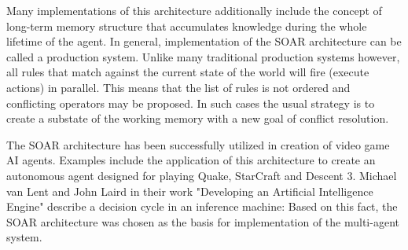 Many implementations of this architecture additionally include the concept of long-term memory structure that accumulates knowledge during the whole lifetime of the agent.
In general, implementation of the SOAR architecture can be called a production system.
Unlike many traditional production systems however, all rules that match against the current state of the world will fire (execute actions) in parallel.
This means that the list of rules is not ordered and conflicting operators may be proposed.
In such cases the usual strategy is to create a substate of the working memory with a new goal of conflict resolution.

The SOAR architecture has been successfully utilized in creation of video game AI agents.
Examples include the application of this architecture to create an autonomous agent designed for playing Quake\cite{laird2001knows}, StarCraft\cite{turner2013soar-sc} and Descent 3\cite{van1999developing}.
Michael van Lent and John Laird in their work "Developing an Artificial Intelligence Engine"\cite{van1999developing} describe a decision cycle in an inference machine:
Based on this fact, the SOAR architecture was chosen as the basis for implementation of the multi-agent system.